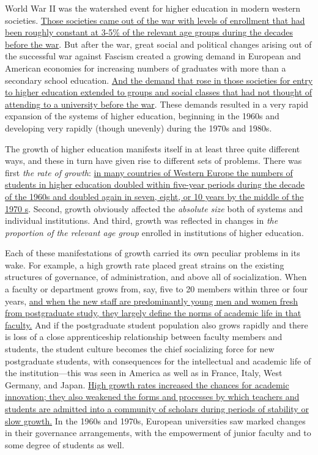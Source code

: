 World War II was the watershed event for higher education in modern
western societies. \transnum \uline{Those societies came out of the war
with levels of enrollment that had been roughly constant at 3-5\% of the relevant age groups during the decades before
the war}. But after the war, great social and political changes arising
out of the successful war against Fascism created a growing demand in
European and American economies for increasing numbers of graduates with
more than a
secondary school education. \transnum \uline{And the demand that rose in
those societies for entry to higher education extended to groups and social classes that had not
thought of attending to a university before the war}. These demands resulted in a very rapid
expansion of the systems of higher education, beginning in the 1960s and
developing very rapidly (though unevenly) during the 1970s and 1980s.



The growth of higher education manifests itself in at least three quite
different ways, and these in turn have given rise to different sets of
problems. There was first  \emph{the rate of growth}: \transnum \uline{in many
countries of Western Europe the numbers of students in higher education
doubled within five-year periods during the decade of the 1960s and doubled
again in seven, eight, or 10 years by the middle of the 1970 s}. Second, growth obviously affected
the \emph{absolute size} both of systems and individual institutions.
And third, growth was reflected in changes in \emph{the proportion of
the relevant age group} enrolled in institutions of higher education.

Each of these manifestations of growth carried its own peculiar
problems in its wake. For example, a high growth rate placed great strains
on the existing structures of governance, of administration, and above all of
socialization. When a faculty or department grows from, say, five to 20
members within three or four years, \transnum \uline{and when the new staff are
predominantly young men and women fresh from postgraduate study, they
largely define the norms of academic life in that faculty.} And if the
postgraduate student population also grows rapidly and there is loss of a
close apprenticeship relationship between faculty members and students,
the student culture becomes the chief socializing force for new postgraduate
students, with consequences for the intellectual and academic life of the
institution---this was seen in America as well as in France, Italy, West
Germany, and Japan. \transnum  \uline{High growth rates increased the chances for
academic innovation; they also weakened the forms and processes by which
teachers and students are admitted into a community of scholars during
periods of stability or slow growth.} In the 1960s and 1970s, European
universities saw marked changes in their governance arrangements, with the
empowerment of junior faculty and to some degree of students as well.



